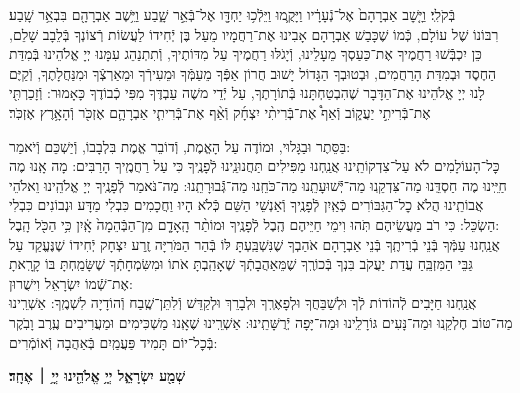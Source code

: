 \documentclass[twoside, openany, parskip=half, 11pt]{book}
\begin{document}
בְּֿקֹלִֽי׃ וַיָּ֤שׇׁב אַבְרָהָם֙ אֶל־נְֿעָרָ֔יו וַיָּקֻ֛מוּ וַיֵּלְֿכ֥וּ יַחְדָּ֖ו אֶל־בְּֿאֵ֣ר שָׁ֑בַע וַיֵּ֥שֶׁב אַבְרָהָ֖ם בִּבְאֵ֥ר שָֽׁבַע׃\\

רִבּוֹנוֹ שֶׁל עוֹלָם, כְּֿמוֹ שֶׁכָּבַשׁ אַבְרָהָם אָבִינוּ אֶת־רַחֲמָיו מֵעַל בֶּן יְֿחִידוֹ לַעֲשׂוֹת רְֿצוֹנְךָ בְּֿלֵבָב שָׁלֵם, כֵּן יִכְבְּֿֿשׁוּ רַחֲמֶיךָ אֶת־כַּעַסְךָ מֵעָלֵינוּ, וְֿיָגֹלּוּ רַחֲמֶיךָ עַל מִדּוֹתֶיךָ, וְֿתִתְנַהֵג עִמָּנוּ יְיָ אֱלֹהֵינוּ בְּֿמִדַּת הַחֶסֶד וּבְמִדַּת הָרַחֲמִים, וּבְטוּבְךָ הַגָּדוֹל יָשׁוּב חֲרוֹן אַפְּֿךָ מֵעַמְּֿךָ וּמֵעִירְֿךָ וּמֵאַרְצְֿךָ וּמִנַּחֲלָתֶךָ, וְֿקַיֶּם לָנוּ יְיָ אֱלֹהֵינוּ אֶת־הַדָּבָר שֶׁהִבְטַחְתָּנוּ בְּֿתוֹרָתֶךָ, עַל יְֿדֵי משֶׁה עַבְדֶּךָ מִפִּי כְֿבוֹדֶךָ כָּאָמוּר: וְֿזָכַרְתִּ֖י אֶת־בְּֿרִיתִ֣י יַעֲק֑וֹב וְֿאַף֩ אֶת־בְּֿרִיתִ֨י יִצְחָ֜ק וְֿאַ֨ף אֶת־בְּֿרִיתִ֧י אַבְרָהָ֛ם אֶזְכֹּ֖ר וְֿהָאָ֥רֶץ אֶזְכֹּֽר׃

בַּסֵּתֶר וּבַגָּלוּי, וּמוֹדֶה עַל הָאֱמֶת, וְֿדוֹבֵר אֱמֶת בִּלְבָבוֹ, וְֿיַשְׁכֵּם וְֿיֹאמַר: \\
כׇּל־הָעוֹלָמִים לֹא עַל־צִדְקוֹתֵֽינוּ אֲנַֽחְנוּ מַפִּילִים תַּחֲנוּנֵֽינוּ לְֿפָנֶֽיךָ כִּי עַל רַחֲמֶֽיךָ הָרַבִּים: מָה אָֽנוּ מֶה חַיֵּֽינוּ מֶה חַסְדֵּֽנוּ מַה־צִּדְקֵֽנוּ מַה־יְּֿֿשׁוּעָתֵֽנוּ מַה־כֹּחֵֽנוּ מַה־גְּֿֿבוּרָתֵֽנוּ: מַה־נֹּאמַר לְֿפָנֶֽיךָ יְיָ אֱלֹהֵֽינוּ וֵאלֹהֵי אֲבוֹתֵֽינוּ הֲלֹא כׇל־הַגִּבּוֹרִים כְּֿאַֽיִן לְֿפָנֶֽיךָ וְֿאַנְשֵׁי הַשֵּׁם כְּֿלֹא הָיוּ וַחֲכָמִים כִּבְלִי מַדָּע וּנְבוֹנִים כִּבְלִי הַשְׂכֵּל: כִּי רֹב מַעֲשֵׂיהֶם תֹּֽהוּ וִימֵי חַיֵּיהֶם הֶֽבֶל לְֿפָנֶֽיךָ וּמוֹתַ֨ר הָֽאָדָ֤ם מִן־הַבְּֿהֵמָה֙ אָֽ֔יִן כִּ֥י הַכֹּ֖ל הָֽבֶל: \\
אֲנַֽחְנוּ עַמְּֿךָ בְּֿנֵי בְֿרִיתֶֽךָ בְּֿנֵי אַבְרָהָם אֹהַבְךָ שֶׁנִּשְׁבַּֽעְתָּ לּוֹ בְּֿהַר הַמֹּרִיָּה זֶֽרַע יִצְחָק יְֿחִידוֹ שֶׁנֶּעֱקַד עַל גַּבֵּי הַמִּזְבֵּֽחַ עֲדַת יַעֲקֹב בִּנְךָ בְּֿכוֹרֶֽךָ שֶׁמֵּאַהֲבָתְֿךָ שֶׁאָהַֽבְתָּ אֹתוֹ וּמִשִּׂמְחָתְֿךָ שֶׁשָּׂמַֽחְתָּ בּוֹ קָרָֽאתָ אֶת־שְֿׁמוֹ יִשְׂרָאֵל וִישֻׁרוּן: \\
אֲנַֽחְנוּ חַיָּבִים לְֿהוֹדוֹת לְֿךָ וּלְשַׁבֵּחֲךָ וּלְפָאֶרְֽךָ וּלְבָרֵךְ וּלְקַדֵּשׁ וְֿלִתֵּן־שֶֽׁבַח וְֿהוֹדָיָה לִשְׁמֶֽךָ: אַשְׁרֵֽינוּ מַה־טּוֹב חֶלְקֵֽנוּ וּמַה־נָּעִים גּוֹרָלֵֽינוּ וּמַה־יָּפָה יְֿרֻשָּׁתֵֽינוּ: אַשְׁרֵֽינוּ שֶׁאָֽנוּ מַשְׁכִּימִים וּמַעֲרִיבִים עֶֽרֶב וָבֹֽקֶר בְּֿכׇל־יוֹם תָּמִיד פַּעֲמַֽיִם בְּֿאַהֲבָה וְֿאוֹמְֿרִים:

\begin{Large}
\textbf{שְׁמַ֖ע יִשְׂרָאֵ֑ל יְיָ֥ אֱלֹהֵ֖ינוּ יְיָ֥ ׀ אֶחָֽד׃}
\end{Large}
\end{document}
